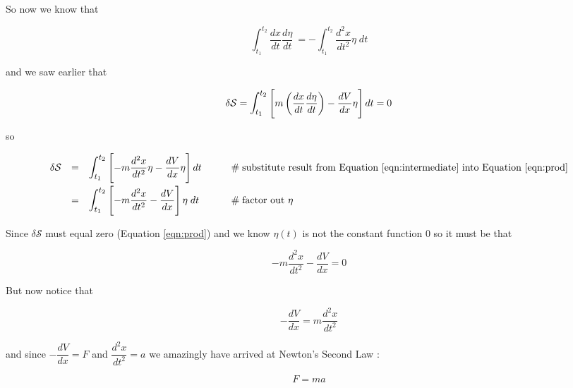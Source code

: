 \documentclass{article}
\theoremstyle{definition}
\begin{document}
\bigskip
\noindent
So now we know that

\begin{equation}
 {\displaystyle  \int_{t_1}^{t_2} \dfrac{dx}{dt} \dfrac{d \eta}{dt} \ = - \int_{t_1}^{t_2}  \dfrac{d^2x}{dt^2} \eta \; dt}  
 \label{eqn:intermediate}
\end{equation}

\bigskip
\noindent
and we saw earlier that 

\begin{equation}
\delta \mathcal{S} =  {\displaystyle \mathlarger{ \int_{t_1}^{t_2}}  
\left [  m \left (\dfrac{dx}{dt} \dfrac{d \eta}{dt} \right ) - \dfrac{dV}{dx} \eta  \right ] dt }  = 0
\label{eqn:prod}
\end{equation}

\bigskip
\noindent
so

\begin{equation*}
\begin{array}{lllll}
\delta \mathcal{S} 
&=&  {\displaystyle \mathlarger{ \int_{t_1}^{t_2}}   \left [  - m \dfrac{d^2x}{dt^2} \eta - \dfrac{dV}{dx} \eta \right ] dt}
											&\qquad \mathrel{\#} \text{substitute result from Equation \ref{eqn:intermediate} into Equation \ref{eqn:prod}} \\
[12pt]
&=&  {\displaystyle \mathlarger{ \int_{t_1}^{t_2}}   \left [  - m \dfrac{d^2x}{dt^2} -  \dfrac{dV}{dx} \right ] \eta \; dt}                
											&\qquad \mathrel{\#} \text{factor out $\eta$} 
\end{array}
\end{equation*}

\bigskip
\noindent
Since $\delta \mathcal{S}$ must equal zero (Equation
\ref{eqn:prod}) and we know $\eta(t)$ is not the constant
function 0 so it must be that 

\bigskip
\begin{equation*}
- m \dfrac{d^2x}{dt^2} -  \dfrac{dV}{dx} = 0
\end{equation*}


\bigskip
\noindent
But now notice that 

\begin{equation*}
 -  \dfrac{dV}{dx} =  m \dfrac{d^2x}{dt^2}
\end{equation*}

\bigskip
\noindent
and since ${\displaystyle -  \dfrac{dV}{dx} = F}$ and
${\displaystyle  \dfrac{d^2x}{dt^2} = a}$ we amazingly have
arrived at Newton's Second Law \cite{wiki:newtons_laws}: 

\bigskip
\begin{equation*}
F = ma
\end{equation*}
\end{document}
